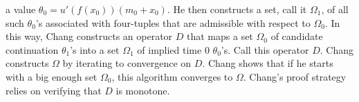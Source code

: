  a value $\theta_0 = u'(f(x_0))(m_0 + x_0)$.  He then constructs a set, call it $\Omega_1$, of all such $\theta_0$'s associated with  four-tuples that
 are admissible with respect to $\Omega_0$.  In this way, Chang constructs an operator $D$ that maps a set   $\Omega_0$  of candidate continuation $\theta_1$'s into a set $\Omega_1$
 of  implied time $0$ $\theta_0$'s.  Call this operator $D$.  Chang constructs $\Omega$ by iterating to convergence on $D$. Chang shows that if  he starts with
 a big enough set $\Omega_0$, this algorithm converges to $\Omega$.  Chang's proof strategy  relies on verifying  that $D$ is
 monotone. %
%
%

